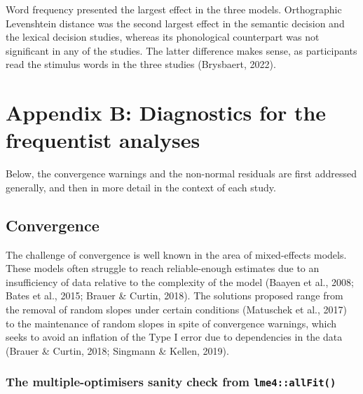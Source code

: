 \documentclass[
  12pt,
  man,floatsintext]{apa7}
\begin{document}
Word frequency presented the largest effect in the three models. Orthographic Levenshtein distance was the second largest effect in the semantic decision and the lexical decision studies, whereas its phonological counterpart was not significant in any of the studies. The latter difference makes sense, as participants read the stimulus words in the three studies (Brysbaert, 2022).

\clearpage

\renewcommand{\thefigure}{B\arabic{figure}} \setcounter{figure}{0}
\renewcommand{\thetable}{B\arabic{table}} \setcounter{table}{0}

\hypertarget{appendix-B-frequentist-analysis-diagnostics}{%
\section{Appendix B: Diagnostics for the frequentist analyses}\label{appendix-B-frequentist-analysis-diagnostics}}

Below, the convergence warnings and the non-normal residuals are first addressed generally, and then in more detail in the context of each study.

\hypertarget{convergence-1}{%
\subsection{Convergence}\label{convergence-1}}

The challenge of convergence is well known in the area of mixed-effects models. These models often struggle to reach reliable-enough estimates due to an insufficiency of data relative to the complexity of the model (Baayen et al., 2008; Bates et al., 2015; Brauer \& Curtin, 2018). The solutions proposed range from the removal of random slopes under certain conditions (Matuschek et al., 2017) to the maintenance of random slopes in spite of convergence warnings, which seeks to avoid an inflation of the Type I error due to dependencies in the data (Brauer \& Curtin, 2018; Singmann \& Kellen, 2019).

\hypertarget{the-multiple-optimisers-sanity-check-from-lme4allfit}{%
\subsubsection{\texorpdfstring{The multiple-optimisers sanity check from \texttt{lme4::allFit()}}{The multiple-optimisers sanity check from lme4::allFit()}}\label{the-multiple-optimisers-sanity-check-from-lme4allfit}}
\end{document}
